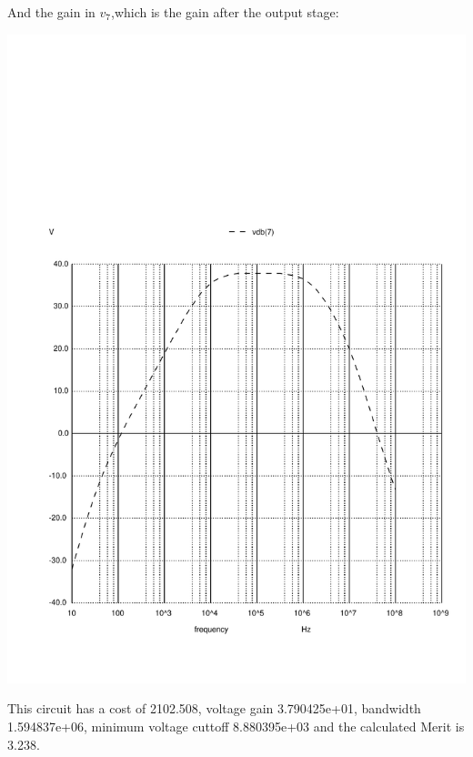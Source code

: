 And the gain in $v_7$,which is the gain after the output stage:

\includegraphics[width=0.8\linewidth]{../sim/vo2f.pdf}

\par


This circuit has a cost of 2102.508, voltage gain 3.790425e+01, bandwidth 1.594837e+06, minimum voltage cuttoff 8.880395e+03 and the  calculated Merit is 3.238.
